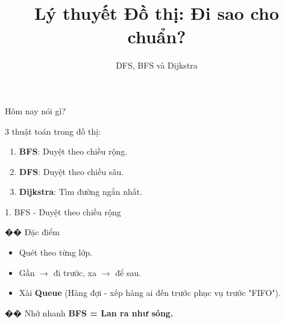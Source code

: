 \documentclass[11pt]{beamer}
\title[DFS, BFS \& Dijkstra]{Lý thuyết Đồ thị: Đi sao cho chuẩn?}
\subtitle{DFS, BFS và Dijkstra}
\date{}
\begin{document}
\begin{frame}
    \titlepage
\end{frame}

\begin{frame}{Hôm nay nói gì?}
    \begin{block}{3 thuật toán trong đồ thị:}
        \begin{enumerate}
            \item \textbf{BFS}: Duyệt theo chiều rộng.
            \item \textbf{DFS}: Duyệt theo chiều sâu.
            \item \textbf{Dijkstra}: Tìm đường ngắn nhất.
        \end{enumerate}
    \end{block}
\end{frame}

\begin{frame}{1. BFS - Duyệt theo chiều rộng}
    \begin{block}{�� Đặc điểm}
        \begin{itemize}
            \item Quét theo từng lớp.
            \item Gần $\rightarrow$ đi trước, xa $\rightarrow$ để sau.
            \item Xài \textbf{Queue} (Hàng đợi - xếp hàng ai đến trước phục vụ trước "FIFO").
        \end{itemize}
    \end{block}
    
    \begin{exampleblock}{�� Nhớ nhanh}
        \textbf{BFS = Lan ra như sóng.}
    \end{exampleblock}
\end{frame}
\end{document}
